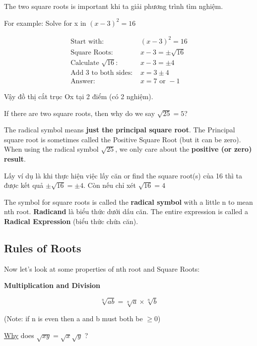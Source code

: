 The two square roots is important khi ta giải phương trình tìm nghiệm. 

For example: Solve for x in $(x-3)^{2}=16$

\[
  \begin{aligned}
    \text{Start with: } &(x-3)^{2}=16\\
    \text{Square Roots: } &x-3= \pm \sqrt{16}\\
    \text{Calculate } \sqrt{16} \text{: } &x-3= \pm4\\
    \text{Add 3 to both sides: } &x=3 \pm 4\\
    \text{Answer: } &x=7 \text{ or } -1
  \end{aligned}
\]

Vậy đồ thị cắt trục Ox tại 2 điểm (có 2 nghiệm).

\vspace{.5cm}

If there are two square roots, then why do we say $\sqrt{25}=5$?

The radical symbol means \textbf{just the principal square root}. The Principal square root is sometimes called the Positive Square Root (but it can be zero). When using the radical symbol $\sqrt{25}$, we only care about the \textbf{positive (or zero) result}.

Lấy ví dụ là khi thực hiện việc lấy căn or find the square root(s) của 16 thì ta được kết quả $\pm \sqrt{16}=\pm 4$. Còn nếu chỉ xét $\sqrt{16}=4$

The symbol for square roots \q{\(\sqrt{}\)} is called the \textbf{radical symbol} with a little n to mean nth root. \textbf{Radicand} là biểu thức dưới dấu căn. The entire expression is called a \textbf{Radical Expression} (biểu thức chứa căn).

\subsection{Rules of Roots}

Now let's look at some properties of nth root and Square Roots:

\textbf{Multiplication and Division}

\begin{equation}
  \sqrt[n]{ab}=\sqrt[n]{a} \times \sqrt[n]{b}
\end{equation}

(Note: if n is even then a and b must both be \(\geq 0\))

\href{https://www.mathsisfun.com/algebra/square-root.html}{Why} does $\sqrt{xy}=\sqrt{x}\sqrt{y}$ ?

